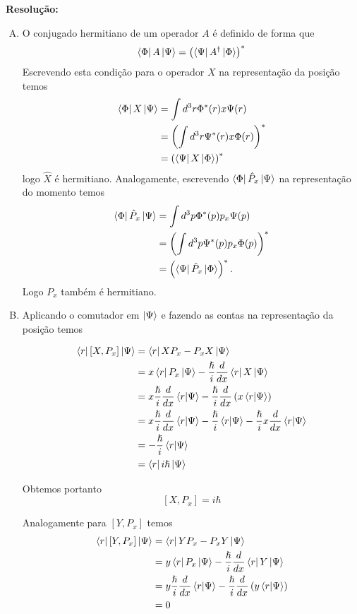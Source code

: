 \documentclass[a4paper, 12pt, notitlepage]{article}
\begin{document}
\begin{enumerate}
\textbf{Resolução: }

\begin{enumerate}[(A)]
  \item O conjugado hermitiano de um operador $A$ é definido de forma que
  \[ \bra{\Phi}A\ket{\Psi} = \left(\bra{\Psi}A^{\dagger}\ket{\Phi} \right)^{\ast} \]
  Escrevendo esta condição para o operador $X$ na representação da posição temos
  \begin{align*}
    \bra{\Phi}X\ket{\Psi} &= \int d^3 r \Phi^{\ast}(r) x \Psi(r) \\
    &= \left(\int d^3 r \Psi^\ast(r) x \Phi(r)\right)^\ast \\
    &= \left(\bra{\Psi}X\ket{\Phi}\right)^\ast
  \end{align*}
  \noindent logo $\hat{X}$ é hermitiano. Analogamente, escrevendo $\bra{\Phi}\hat{P}_x\ket{\Psi}$ na representação do momento temos
  \begin{align*}
    \bra{\Phi}\hat{P}_x\ket{\Psi} &= \int d^3 p \Phi^\ast(p) p_x \Psi(p) \\
    &= \left( \int d^3 p \Psi^\ast(p) p_x \Phi(p)\right)^\ast \\
    &= \left( \bra{\Psi}\hat{P}_x \ket{\Phi} \right)^\ast.
  \end{align*}
  Logo $P_x$ também é hermitiano.
  
  \item Aplicando o comutador em $\ket{\Psi}$ e fazendo as contas na representação da posição temos
  
  \begin{align*}
    \bra{r} [X, P_x] \ket{\Psi} &= \bra{r} XP_x - P_xX \ket{\Psi} \\
    &= x\bra{r}P_x\ket{\Psi} - \frac{\hslash}{i}\frac{d}{dx}\bra{r}X\ket{\Psi} \\
    &= x\frac{\hslash}{i}\frac{d}{dx}\bra{r}\ket{\Psi} - \frac{\hslash}{i}\frac{d}{dx}\left(x \bra{r}\ket{\Psi}\right)\\
    &= x\frac{\hslash}{i}\frac{d}{dx}\bra{r}\ket{\Psi} - \frac{\hslash}{i}\bra{r}\ket{\Psi} - \frac{\hslash}{i}x\frac{d}{dx}\bra{r}\ket{\Psi} \\
    &= -\frac{\hslash}{i} \bra{r}\ket{\Psi} \\
    &= \bra{r}i\hslash\ket{\Psi}
  \end{align*}
  
  Obtemos portanto
  \[
    [X, P_x] = i\hbar
  \]
  
  Analogamente para $[Y, P_x]$ temos
  \begin{align*}
    \bra{r} [Y, P_x] \ket{\Psi} &= \bra{r} YP_x - P_xY \ket{\Psi} \\
    &= y\bra{r}P_x\ket{\Psi} - \frac{\hslash}{i}\frac{d}{dx}\bra{r}Y\ket{\Psi} \\
    &= y\frac{\hslash}{i}\frac{d}{dx} \bra{r}\ket{\Psi} - \frac{\hslash}{i} \frac{d}{dx} \left(y\bra{r}\ket{\Psi}\right) \\
    &= 0
  \end{align*}
  

\end{enumerate}
\end{enumerate}
\end{document}
